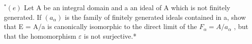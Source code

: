 \(^{*}(e)\) Let A be an integral domain and a an ideal of A which is not finitely generated. If \((a_{\alpha})\) is the family of finitely generated ideals contained in a, show that E = A/a is canonically isomorphic to the direct limit of the \(F_{\alpha} = A/a_{\alpha}\) , but that the homomorphism \(\varepsilon\) is not surjective.*
\relax{}
